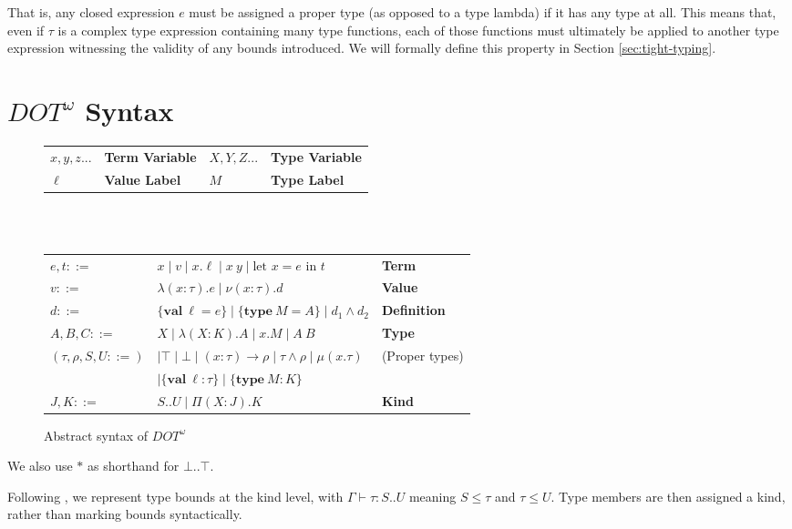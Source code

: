 \documentclass[a4paper, 10pt]{article}
\newcommand{\DOTw}{\ensuremath{DOT^\omega}}
\newcommand{\interval}[2]{#1 .. #2}
\newcommand{\KDepArr}[3]{\Pi(#1:#2).#3}
\newcommand{\TDepArr}[3]{(#1:#2) \rightarrow #3}
\newcommand{\objtyp}[3]{\{ \textbf{#1}\ #2 : #3 \}}
\newcommand{\objval}[3]{\{ \textbf{#1}\ #2 = #3 \}}
\newcommand{\termlet}[3]{\text{let }#1 = #2\text{ in }#3}
\begin{document}
That is, any closed expression $e$ must be assigned a proper type (as opposed
to a type lambda) if it has any type at all. This means that, even if $\tau$ is
a complex type expression containing many type functions, each of those
functions must ultimately be applied to another type expression witnessing the
validity of any bounds introduced. We will formally define this property in
Section \ref{sec:tight-typing}.

\section{$\DOTw$ Syntax}

\begin{figure}[ht]
  \centering
  \begin{tabularx}{\linewidth}{XXXX}
    $x,y,z$... & \textbf{Term Variable} & $X,Y,Z$... & \textbf{Type Variable}\\
    $\ell$ & \textbf{Value Label} & $M$ & \textbf{Type Label} \\
  \end{tabularx}
  \hfill \\
  \hfill \\
  \begin{tabularx}{\linewidth}{XlX}
    $e,t ::=$ &
    $x \mid v \mid x.\ell \mid x\ y \mid \termlet{x}{e}{t}$
      & \textbf{Term} \\
    $v ::=$ & $\lambda(x:\tau).e \mid \nu(x:\tau).d$ & \textbf{Value} \\
    $d ::=$ & $\objval{val}{\ell}{e} \mid \objval{type}{M}{A} \mid
      d_1 \land d_2$ & \textbf{Definition} \\
    $A,B,C ::=$ &
    $X \mid \lambda(X:K).A \mid x.M \mid A\ B$ & \textbf{Type} \\
    $(\tau, \rho, S, U ::=)$ &
      $\mid \top \mid \bot \mid \TDepArr{x}{\tau}{\rho}
      \mid \tau \land \rho \mid \mu(x.\tau)$ & (Proper types) \\
    & $\mid \objtyp{val}{\ell}{\tau} \mid \objtyp{type}{M}{K}$ & \\
    $J,K ::=$ & $\interval{S}{U} \mid \KDepArr{X}{J}{K}$ & \textbf{Kind} \\
  \end{tabularx}
  \caption{Abstract syntax of $\DOTw{}$}
\end{figure}

We also use $*$ as shorthand for $\interval{\bot}{\top}$.

Following \citet{stucki2021}, we represent type bounds at the kind level, with
$\Gamma \vdash \tau : \interval{S}{U}$ meaning $S \le \tau$ and $\tau \le U$.
Type members are then assigned a kind, rather than marking bounds
syntactically.
\end{document}
